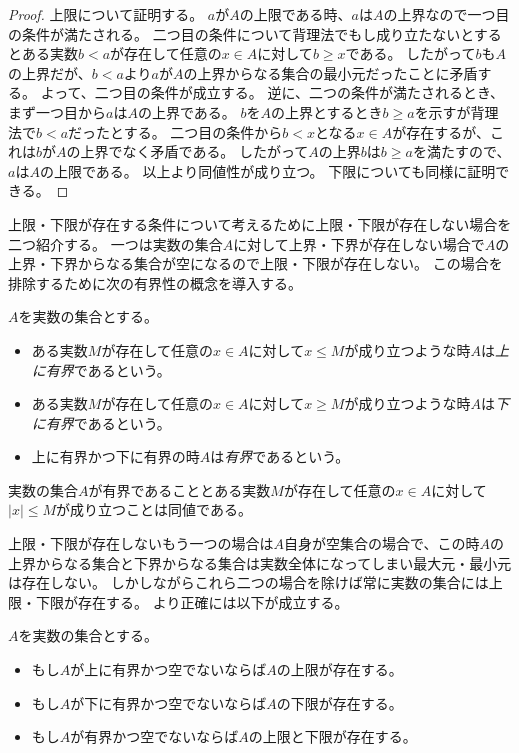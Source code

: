 \begin{proof}
上限について証明する。
$a$が$A$の上限である時、$a$は$A$の上界なので一つ目の条件が満たされる。
二つ目の条件について背理法でもし成り立たないとするとある実数$b < a$が存在して任意の$x \in A$に対して$b \ge x$である。
したがって$b$も$A$の上界だが、$b < a$より$a$が$A$の上界からなる集合の最小元だったことに矛盾する。
よって、二つ目の条件が成立する。
逆に、二つの条件が満たされるとき、まず一つ目から$a$は$A$の上界である。
$b$を$A$の上界とするとき$b \ge a$を示すが背理法で$b < a$だったとする。
二つ目の条件から$b < x$となる$x \in A$が存在するが、これは$b$が$A$の上界でなく矛盾である。
したがって$A$の上界$b$は$b \ge a$を満たすので、$a$は$A$の上限である。
以上より同値性が成り立つ。
下限についても同様に証明できる。
\end{proof}

上限・下限が存在する条件について考えるために上限・下限が存在しない場合を二つ紹介する。
一つは実数の集合$A$に対して上界・下界が存在しない場合で$A$の上界・下界からなる集合が空になるので上限・下限が存在しない。
この場合を排除するために次の有界性の概念を導入する。

\begin{definition}[集合の有界性]
\label{d_bdd}
$A$を実数の集合とする。
\begin{itemize}
\item
ある実数$M$が存在して任意の$x \in A$に対して$x \le M$が成り立つような時$A$は\emph{上に有界}であるという。
\item
ある実数$M$が存在して任意の$x \in A$に対して$x \ge M$が成り立つような時$A$は\emph{下に有界}であるという。
\item
上に有界かつ下に有界の時$A$は\emph{有界}であるという。
\end{itemize}
\end{definition}

\begin{remark}
実数の集合$A$が有界であることとある実数$M$が存在して任意の$x \in A$に対して$|x| \le M$が成り立つことは同値である。
\end{remark}

上限・下限が存在しないもう一つの場合は$A$自身が空集合の場合で、この時$A$の上界からなる集合と下界からなる集合は実数全体になってしまい最大元・最小元は存在しない。
しかしながらこれら二つの場合を除けば常に実数の集合には上限・下限が存在する。
より正確には以下が成立する。

\begin{proposition}[実数の連続性]
$A$を実数の集合とする。
\begin{itemize}
\item
もし$A$が上に有界かつ空でないならば$A$の上限が存在する。
\item
もし$A$が下に有界かつ空でないならば$A$の下限が存在する。
\item
もし$A$が有界かつ空でないならば$A$の上限と下限が存在する。
\end{itemize}
\end{proposition}

